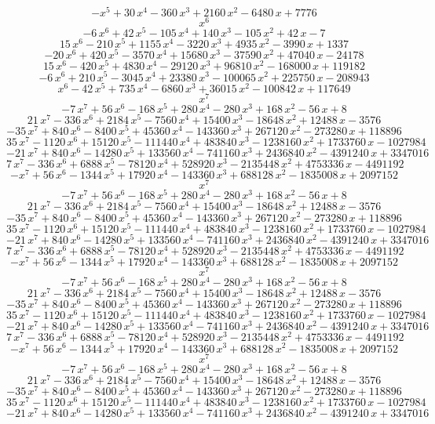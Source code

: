 $$-x^5+30\,x^4-360\,x^3+2160\,x^2-6480\,x+7776$$
$$x^6$$
$$-6\,x^6+42\,x^5-105\,x^4+140\,x^3-105\,x^2+42\,x-7$$
$$15\,x^6-210\,x^5+1155\,x^4-3220\,x^3+4935\,x^2-3990\,x+1337$$
$$-20\,x^6+420\,x^5-3570\,x^4+15680\,x^3-37590\,x^2+47040\,x-24178$$
$$15\,x^6-420\,x^5+4830\,x^4-29120\,x^3+96810\,x^2-168000\,x+119182$$
$$-6\,x^6+210\,x^5-3045\,x^4+23380\,x^3-100065\,x^2+225750\,x-208943$$
$$x^6-42\,x^5+735\,x^4-6860\,x^3+36015\,x^2-100842\,x+117649$$
$$x^7$$
$$-7\,x^7+56\,x^6-168\,x^5+280\,x^4-280\,x^3+168\,x^2-56\,x+8$$
$$21\,x^7-336\,x^6+2184\,x^5-7560\,x^4+15400\,x^3-18648\,x^2+12488\,x
 -3576$$
$$-35\,x^7+840\,x^6-8400\,x^5+45360\,x^4-143360\,x^3+267120\,x^2-
 273280\,x+118896$$
$$35\,x^7-1120\,x^6+15120\,x^5-111440\,x^4+483840\,x^3-1238160\,x^2+
 1733760\,x-1027984$$
$$-21\,x^7+840\,x^6-14280\,x^5+133560\,x^4-741160\,x^3+2436840\,x^2-
 4391240\,x+3347016$$
$$7\,x^7-336\,x^6+6888\,x^5-78120\,x^4+528920\,x^3-2135448\,x^2+
 4753336\,x-4491192$$
$$-x^7+56\,x^6-1344\,x^5+17920\,x^4-143360\,x^3+688128\,x^2-1835008\,
 x+2097152$$
$$x^7$$
$$-7\,x^7+56\,x^6-168\,x^5+280\,x^4-280\,x^3+168\,x^2-56\,x+8$$
$$21\,x^7-336\,x^6+2184\,x^5-7560\,x^4+15400\,x^3-18648\,x^2+12488\,x
 -3576$$
$$-35\,x^7+840\,x^6-8400\,x^5+45360\,x^4-143360\,x^3+267120\,x^2-
 273280\,x+118896$$
$$35\,x^7-1120\,x^6+15120\,x^5-111440\,x^4+483840\,x^3-1238160\,x^2+
 1733760\,x-1027984$$
$$-21\,x^7+840\,x^6-14280\,x^5+133560\,x^4-741160\,x^3+2436840\,x^2-
 4391240\,x+3347016$$
$$7\,x^7-336\,x^6+6888\,x^5-78120\,x^4+528920\,x^3-2135448\,x^2+
 4753336\,x-4491192$$
$$-x^7+56\,x^6-1344\,x^5+17920\,x^4-143360\,x^3+688128\,x^2-1835008\,
 x+2097152$$
$$x^7$$
$$-7\,x^7+56\,x^6-168\,x^5+280\,x^4-280\,x^3+168\,x^2-56\,x+8$$
$$21\,x^7-336\,x^6+2184\,x^5-7560\,x^4+15400\,x^3-18648\,x^2+12488\,x
 -3576$$
$$-35\,x^7+840\,x^6-8400\,x^5+45360\,x^4-143360\,x^3+267120\,x^2-
 273280\,x+118896$$
$$35\,x^7-1120\,x^6+15120\,x^5-111440\,x^4+483840\,x^3-1238160\,x^2+
 1733760\,x-1027984$$
$$-21\,x^7+840\,x^6-14280\,x^5+133560\,x^4-741160\,x^3+2436840\,x^2-
 4391240\,x+3347016$$
$$7\,x^7-336\,x^6+6888\,x^5-78120\,x^4+528920\,x^3-2135448\,x^2+
 4753336\,x-4491192$$
$$-x^7+56\,x^6-1344\,x^5+17920\,x^4-143360\,x^3+688128\,x^2-1835008\,
 x+2097152$$
$$x^7$$
$$-7\,x^7+56\,x^6-168\,x^5+280\,x^4-280\,x^3+168\,x^2-56\,x+8$$
$$21\,x^7-336\,x^6+2184\,x^5-7560\,x^4+15400\,x^3-18648\,x^2+12488\,x
 -3576$$
$$-35\,x^7+840\,x^6-8400\,x^5+45360\,x^4-143360\,x^3+267120\,x^2-
 273280\,x+118896$$
$$35\,x^7-1120\,x^6+15120\,x^5-111440\,x^4+483840\,x^3-1238160\,x^2+
 1733760\,x-1027984$$
$$-21\,x^7+840\,x^6-14280\,x^5+133560\,x^4-741160\,x^3+2436840\,x^2-
 4391240\,x+3347016$$
